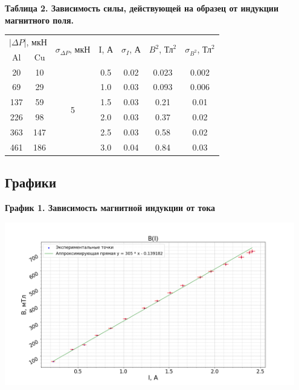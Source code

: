 \documentclass[15pt,a5paper,reqno]{article}
\begin{document}
    \noindent\hypertarget{table_2}{\textbf{Таблица 2. Зависимость силы, действующей на образец от индукции магнитного поля.}}
    \begin{center}
        \begin{tabular}{|c|c|c|c|c|c|c|}
        \hline
        \multicolumn{2}{|c|}{$|\Delta P$|, мкН} & \multirow{2}{*}{$\sigma_{\Delta P}$, мкН} & \multirow{2}{*}{I, А} & \multirow{2}{*}{$\sigma_I$, А} & \multirow{2}{*}{$B^2$, $\text{Тл}^2$} & \multirow{2}{*}{$\sigma_{B^2}$, $\text{Тл}^2$}\\ \hhline{--~~~~~}
        Al  & Cu  &                    &       &      &      &   \\ \hline\hline

        20  & 10  & \multirow{6}{*}{5} & 0.5   & 0.02 & 0.023  & 0.002 \\ \hhline{--~----}
        69  & 29  &                    & 1.0   & 0.03 & 0.093  & 0.006 \\ \hhline{--~----}
        137 & 59  &                    & 1.5   & 0.03 & 0.21   & 0.01  \\ \hhline{--~----}
        226 & 98  &                    & 2.0   & 0.03 & 0.37   & 0.02  \\ \hhline{--~----}
        363 & 147 &                    & 2.5   & 0.03 & 0.58   & 0.02  \\ \hhline{--~----}
        461 & 186 &                    & 3.0   & 0.04 & 0.84   & 0.03  \\ \hline

        \end{tabular}
    \end{center}

    \newpage
    \subsection{Графики}

    \noindent\hypertarget{graph_1}{\textbf{График 1. Зависимость магнитной индукции от тока}}
    \begin{center}
        \includegraphics[width = 0.95\textwidth]{images/magnetic_field.png}
    \end{center}
\end{document}
